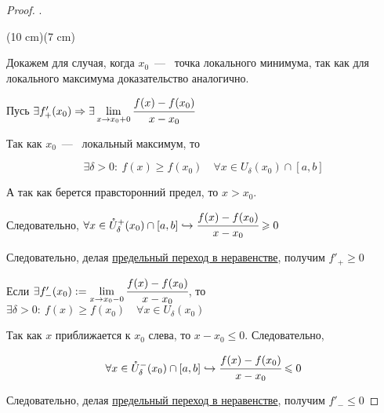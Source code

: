 \begin{proof}
	.
	
	\sidefig(10 cm)(7 cm)	
	{\begin{flushleft}
		\normalsize
		Докажем для случая, когда $x_{0}$~---~ точка локального минимума, так как для локального максимума доказательство аналогично.	
		
		Пусь $ \exists f'_{+}(x_{0}) \Rightarrow \exists \lim\limits_{x\to x_{0}+0} \cfrac{f(x)-f(x_{0})}{x - x_{0}}$
		
		Так как $x_{0}$~---~ локальный максимум, то
		
		$$\exists \delta > 0: \ f(x)\geq f(x_{0}) \quad \forall x\in U_{\delta}(x_{0}) \cap [a,b]$$
		
		А так как берется правсторонний предел, то $x>x_{0}$. 
			
	\end{flushleft}
	}
	{
	}

    Следовательно, $\forall x \in \mathring{U}^{+}_{\delta} (x_{0}) \cap [a, b] \hookrightarrow \cfrac{f(x)-f(x_{0})}{x-x_{0}} \geq 0 $
 
	Следовательно, делая \hyperlink{thm4.8}{предельный переход в неравенстве}, получим $f'_{+} \geq 0$
	
	Если $\exists f'_{-}(x_{0}) := \lim\limits_{x\to x_{0}-0} \cfrac{f(x)-f(x_{0})}{x-x_{0}}$, то
	$ \exists \delta > 0: \ f(x) \geq f(x_{0}) \quad \forall x\in U_{\delta}(x_{0})
	$
	
	Так как $x$ приближается к $x_{0}$ слева, то $x-x_{0} \leq 0$. Следовательно,
	
	$$\forall x \in \mathring{U}^{-}_{\delta} (x_{0}) \cap [a, b] \hookrightarrow \cfrac{f(x)-f(x_{0})}{x-x_{0}} \leq 0
	$$
	
	Следовательно, делая \hyperlink{thm4.8}{предельный переход в неравенстве}, получим $f'_{-} \leq 0$
\end{proof}

